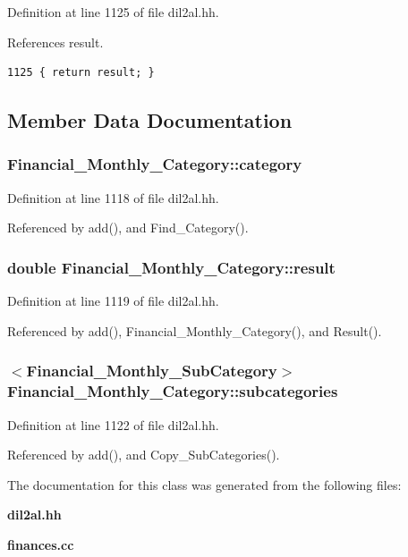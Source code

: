 Definition at line 1125 of file dil2al.hh.

References result.



\footnotesize\begin{verbatim}1125 { return result; }
\end{verbatim}\normalsize 


\subsection{Member Data Documentation}
\subsubsection{ Financial\_\-Monthly\_\-Category::category\hspace{0.3cm}{\tt  [protected]}}\label{classFinancial__Monthly__Category_n0}




Definition at line 1118 of file dil2al.hh.

Referenced by add(), and Find\_\-Category().
\subsubsection{\setlength{\rightskip}{0pt plus 5cm}double Financial\_\-Monthly\_\-Category::result\hspace{0.3cm}{\tt  [protected]}}\label{classFinancial__Monthly__Category_n1}




Definition at line 1119 of file dil2al.hh.

Referenced by add(), Financial\_\-Monthly\_\-Category(), and Result().
\subsubsection{$<${\bf Financial\_\-Monthly\_\-Sub\-Category}$>$ Financial\_\-Monthly\_\-Category::subcategories}\label{classFinancial__Monthly__Category_m0}




Definition at line 1122 of file dil2al.hh.

Referenced by add(), and Copy\_\-Sub\-Categories().

The documentation for this class was generated from the following files:\begin{CompactItemize}
\item 
{\bf dil2al.hh}\item 
{\bf finances.cc}\end{CompactItemize}
